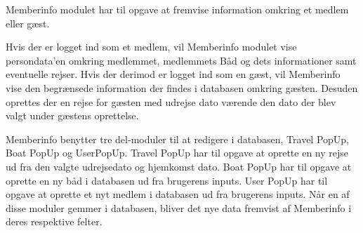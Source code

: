 Memberinfo modulet har til opgave at fremvise information omkring et medlem eller gæst.

Hvis der er logget ind som et medlem, vil Memberinfo modulet vise persondata’en omkring medlemmet, medlemmets Båd og dets informationer samt eventuelle rejser. Hvis der derimod er logget ind som en gæst, vil Memberinfo vise den begrænsede information der findes i databasen omkring gæsten. Desuden oprettes der en rejse for gæsten med udrejse dato værende den dato der blev valgt under gæstens oprettelse. 

Memberinfo benytter tre del-moduler til at redigere i databasen, Travel PopUp, Boat PopUp og UserPopUp. Travel PopUp har til opgave at oprette en ny rejse ud fra den valgte udrejsedato og hjemkomst dato. Boat PopUp har til opgave at oprette en ny båd i databasen ud fra brugerens inputs. User PopUp har til opgave at oprette et nyt medlem i databasen ud fra brugerens inputs. Når en af disse moduler gemmer i databasen, bliver det nye data fremvist af Memberinfo i deres respektive felter.
